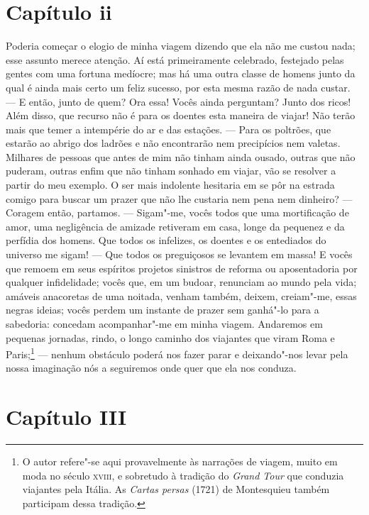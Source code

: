 \section*{Capítulo ii}

 Poderia começar o elogio de minha viagem dizendo que ela não me custou
nada; esse assunto merece atenção. Aí está primeiramente celebrado,
festejado pelas gentes com uma fortuna medíocre; mas há uma outra
classe de homens junto da qual é ainda mais certo um feliz sucesso, por
esta mesma razão de nada custar. --- E então, junto de quem? Ora essa!
Vocês ainda perguntam? Junto dos ricos! Além disso, que recurso não é
para os doentes esta maneira de viajar! Não terão mais que temer a
intempérie do ar e das estações. --- Para os poltrões, que estarão ao
abrigo dos ladrões e não encontrarão nem precipícios nem valetas.
Milhares de pessoas que antes de mim não tinham ainda ousado, outras
que não puderam, outras enfim que não tinham sonhado em viajar, vão se
resolver a partir do meu exemplo. O ser mais indolente hesitaria em se
pôr na estrada comigo para buscar um prazer que não lhe custaria nem
pena nem dinheiro? --- Coragem então, partamos. --- Sigam"-me, vocês
todos que uma mortificação de amor, uma negligência de amizade
retiveram em casa, longe da pequenez e da perfídia dos homens. Que
todos os infelizes, os doentes e os entediados do universo me sigam!
--- Que todos os preguiçosos se levantem em massa! E vocês que remoem
em seus espíritos projetos sinistros de reforma ou aposentadoria por
qualquer infidelidade; vocês que, em um budoar, renunciam ao mundo pela
vida; amáveis anacoretas de uma noitada, venham também, deixem,
creiam"-me, essas negras ideias; vocês perdem um instante de prazer sem
ganhá"-lo para a sabedoria: concedam acompanhar"-me em minha viagem.
Andaremos em pequenas jornadas, rindo, o longo caminho dos viajantes
que viram Roma e Paris;\footnote{ O autor refere"-se aqui provavelmente
às narrações de viagem, muito em moda no século \textsc{xviii}, e sobretudo à
tradição do \textit{Grand Tour} que conduzia viajantes pela Itália. As
\textit{Cartas persas} (1721) de Montesquieu também participam dessa
tradição.} --- nenhum obstáculo poderá nos fazer parar e
deixando"-nos levar pela nossa imaginação nós a seguiremos onde quer que
ela nos conduza.

\section*{Capítulo III}

